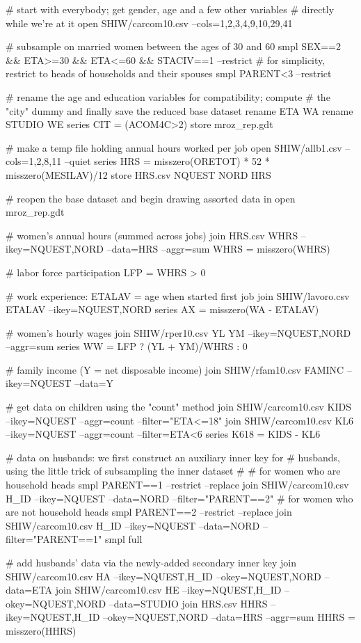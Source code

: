 \begin{code}
# start with everybody; get gender, age and a few other variables 
# directly while we're at it
open SHIW/carcom10.csv --cols=1,2,3,4,9,10,29,41

# subsample on married women between the ages of 30 and 60
smpl SEX==2 && ETA>=30 && ETA<=60 && STACIV==1 --restrict
# for simplicity, restrict to heads of households and their spouses
smpl PARENT<3  --restrict

# rename the age and education variables for compatibility; compute
# the "city" dummy and finally save the reduced base dataset
rename ETA WA
rename STUDIO WE
series CIT = (ACOM4C>2)
store mroz_rep.gdt

# make a temp file holding annual hours worked per job
open SHIW/allb1.csv --cols=1,2,8,11 --quiet
series HRS = misszero(ORETOT) * 52 * misszero(MESILAV)/12
store HRS.csv NQUEST NORD HRS

# reopen the base dataset and begin drawing assorted data in
open mroz_rep.gdt

# women's annual hours (summed across jobs) 
join HRS.csv WHRS --ikey=NQUEST,NORD --data=HRS --aggr=sum
WHRS = misszero(WHRS)

# labor force participation
LFP = WHRS > 0

# work experience: ETALAV = age when started first job
join SHIW/lavoro.csv ETALAV --ikey=NQUEST,NORD
series AX = misszero(WA - ETALAV)

# women's hourly wages
join SHIW/rper10.csv YL YM --ikey=NQUEST,NORD --aggr=sum
series WW = LFP ? (YL + YM)/WHRS : 0

# family income (Y = net disposable income)
join SHIW/rfam10.csv FAMINC --ikey=NQUEST --data=Y

# get data on children using the "count" method
join SHIW/carcom10.csv KIDS --ikey=NQUEST --aggr=count --filter="ETA<=18"
join SHIW/carcom10.csv KL6 --ikey=NQUEST --aggr=count --filter=ETA<6
series K618 = KIDS - KL6

# data on husbands: we first construct an auxiliary inner key for 
# husbands, using the little trick of subsampling the inner dataset
#
# for women who are household heads
smpl PARENT==1 --restrict --replace
join SHIW/carcom10.csv H_ID --ikey=NQUEST --data=NORD --filter="PARENT==2"
# for women who are not household heads
smpl PARENT==2 --restrict --replace
join SHIW/carcom10.csv H_ID --ikey=NQUEST --data=NORD --filter="PARENT==1"
smpl full

# add husbands' data via the newly-added secondary inner key
join SHIW/carcom10.csv HA --ikey=NQUEST,H_ID --okey=NQUEST,NORD --data=ETA
join SHIW/carcom10.csv HE --ikey=NQUEST,H_ID --okey=NQUEST,NORD --data=STUDIO
join HRS.csv HHRS --ikey=NQUEST,H_ID --okey=NQUEST,NORD --data=HRS --aggr=sum
HHRS = misszero(HHRS)


\end{code}
